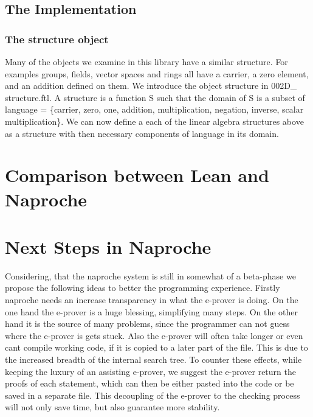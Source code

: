 \documentclass[11pt]{article}
\begin{document}
\begin{figure}[h]
\begin{center}
\end{center}
\end{figure}

\subsection{The Implementation}
\subsubsection{The structure object}
Many of the objects we examine in this library have a similar structure. For examples groups, fields, vector spaces and rings all have a carrier, a zero element, and an addition defined on them. We introduce the object structure in 002D\_ structure.ftl. 
A structure is a function S such that the domain of S is a subset of language =  \{carrier, zero, one, addition, multiplication, negation, inverse, scalar multiplication\}. We can now define a each of the linear algebra structures above as a structure with then necessary components of language in its domain. 



\section{Comparison between Lean and Naproche}


\section{Next Steps in Naproche}

Considering, that the naproche system is still in somewhat of a beta-phase we propose the following ideas to better the programming experience.
Firstly naproche needs an increase transparency in what the e-prover is doing. On the one hand the e-prover is a huge blessing, simplifying many steps. On the other hand it is the source of many problems, since the programmer can not guess where the e-prover is gets stuck. Also the e-prover will often take longer or even cant compile working code, if it is copied to a later part of the file. This is due to the increased breadth of the internal search tree. To counter these effects, while keeping the luxury of an assisting e-prover, we suggest the e-prover return the proofs of each statement, which can then be either pasted into the code or be saved in a separate file. This decoupling of the e-prover to the checking process will not only save time, but also guarantee more stability. 
\end{document}

